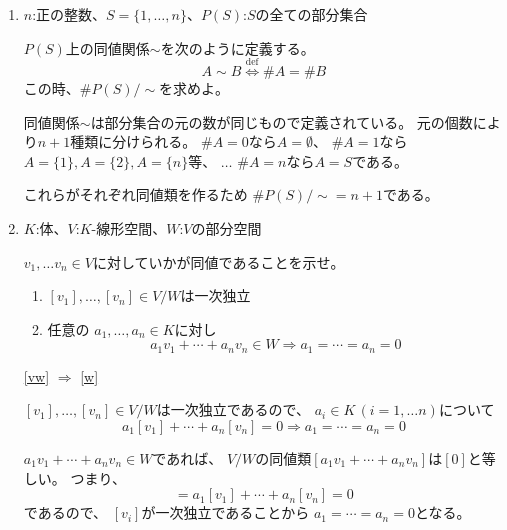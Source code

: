 \documentclass[12pt,b5paper]{ltjsarticle}
\begin{document}
\begin{enumerate}
 \item
      $n$:正の整数、$S=\{1,\dots,n\}$、$P(S)$:$S$の全ての部分集合

      $P(S)$上の同値関係$\sim$を次のように定義する。
      \begin{equation}
       A \sim B \stackrel{\mathrm{def}}{\Leftrightarrow}
        \# A = \# B
      \end{equation}
      この時、$\#P(S)/\sim$を求めよ。

      \dotfill

      同値関係$\sim$は部分集合の元の数が同じもので定義されている。
      元の個数により$n+1$種類に分けられる。
      $\#A = 0$なら$A=\emptyset$、
      $\#A = 1$なら$A=\{1\}, A=\{2\}, A=\{n\}$等、
      $\dots$
      $\#A = n$なら$A=S$である。


      これらがそれぞれ同値類を作るため
      $\#P(S)/\sim = n+1$である。

      \hrulefill

 \item
      $K$:体、$V$:$K$-線形空間、$W$:$V$の部分空間

      $v_1,\dots v_n\in V$に対していかが同値であることを示せ。
       \begin{enumerate}
        \item \label{vw}
             $[v_1],\dots,[v_n]\in V/W$は一次独立
        \item \label{w}
             任意の
             $a_1,\dots,a_n\in K$に対し
             \begin{equation}
              a_1v_1+\cdots+a_nv_n \in W
               \Rightarrow a_1=\cdots = a_n=0
             \end{equation}
       \end{enumerate}

      \dotfill

      \ref{vw} $\Rightarrow$ \ref{w}

      $[v_1],\dots,[v_n]\in V/W$は一次独立であるので、
      $a_i\in K \, (i=1,\dots n)$について
      \begin{equation}
       a_1[v_1]+\cdots + a_n[v_n]=0 \Rightarrow a_1=\cdots = a_n=0\label{def_lin}
      \end{equation}

      $a_1v_1+\cdots+a_nv_n \in W$であれば、
      $V/W$の同値類$[a_1v_1+\cdots+a_nv_n]$は$[0]$と等しい。
      つまり、
      \begin{equation}
       [a_1v_1+\cdots+a_nv_n] = a_1[v_1]+\cdots + a_n[v_n] =0
      \end{equation}
      であるので、
      $[v_i]$が一次独立であることから
      $a_1=\cdots =a_n=0$となる。


\end{enumerate}
\end{document}
